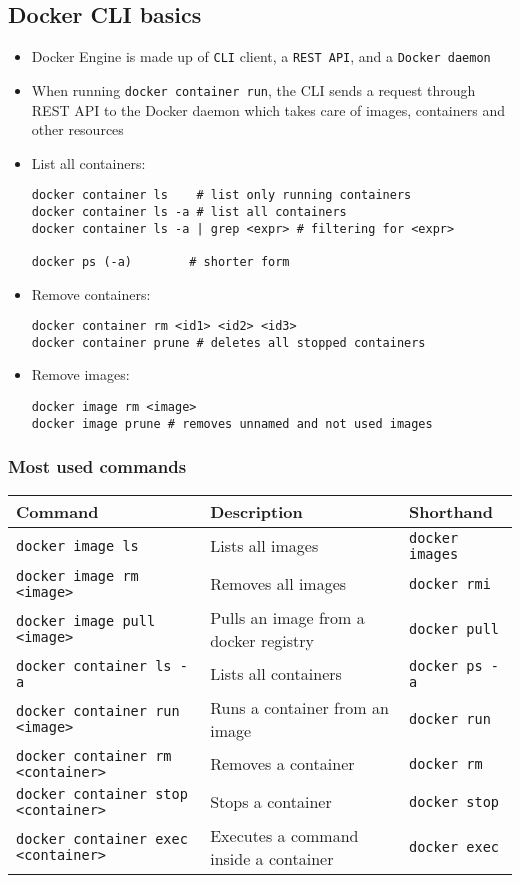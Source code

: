 \documentclass[11pt]{scrartcl}
\begin{document}
\subsection{Docker CLI basics} \label{cli_basics}
\begin{itemize}
	\item Docker Engine is made up of \texttt{CLI} client, a \texttt{REST API}, and a \texttt{Docker daemon}
	\item When running \texttt{docker container run}, the CLI sends a request through REST API to the Docker daemon which takes care of images, containers and other resources
	\item List all containers:\begin{lstlisting}	
docker container ls    # list only running containers
docker container ls -a # list all containers
docker container ls -a | grep <expr> # filtering for <expr>
		
docker ps (-a) 		  # shorter form
	\end{lstlisting}
	\item Remove containers:
	\begin{lstlisting}
docker container rm <id1> <id2> <id3>
docker container prune # deletes all stopped containers
	\end{lstlisting}
	\item Remove images:
	\begin{lstlisting}
docker image rm <image>
docker image prune # removes unnamed and not used images
	\end{lstlisting}
\end{itemize}

\subsubsection{Most used commands} \label{commands}
\begin{tabular}{|l|l|l|}
	\hline
	\textbf{Command}							&	\textbf{Description}					&	\textbf{Shorthand}		\\
	\hline
	\texttt{docker image ls} 					&	Lists all images						&	\texttt{docker images}	\\
	\hline
	\texttt{docker image rm <image>}			&	Removes all images						&	\texttt{docker rmi}		\\
	\hline
	\texttt{docker image pull <image>}			&	Pulls an image from a docker registry	&	\texttt{docker pull}	\\
	\hline
	\texttt{docker container ls -a}				&	Lists all containers					& 	\texttt{docker ps -a}	\\
	\hline
	\texttt{docker container run <image>}		&	Runs a container from an image			&	\texttt{docker run}		\\
	\hline
	\texttt{docker container rm <container>}	&	Removes a container						&	\texttt{docker rm}		\\
	\hline
	\texttt{docker container stop <container>}	&	Stops a container						&	\texttt{docker stop}	\\
	\hline
	\texttt{docker container exec <container>}	&	Executes a command inside a container	& 	\texttt{docker exec}	\\
	\hline
\end{tabular}
\end{document}
